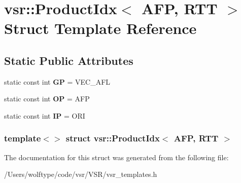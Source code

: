 \hypertarget{structvsr_1_1_product_idx_3_01_a_f_p_00_01_r_t_t_01_4}{\section{vsr\-:\-:Product\-Idx$<$ A\-F\-P, R\-T\-T $>$ Struct Template Reference}
\label{structvsr_1_1_product_idx_3_01_a_f_p_00_01_r_t_t_01_4}
}
\subsection*{Static Public Attributes}
\begin{DoxyCompactItemize}
\item 
\hypertarget{structvsr_1_1_product_idx_3_01_a_f_p_00_01_r_t_t_01_4_a68bdb5ba056c63dca34629e9232c19c9}{static const int {\bfseries G\-P} = V\-E\-C\-\_\-\-A\-F\-L}\label{structvsr_1_1_product_idx_3_01_a_f_p_00_01_r_t_t_01_4_a68bdb5ba056c63dca34629e9232c19c9}

\item 
\hypertarget{structvsr_1_1_product_idx_3_01_a_f_p_00_01_r_t_t_01_4_a8c5fbfea09cfeab2cc9fb8371e3c080f}{static const int {\bfseries O\-P} = A\-F\-P}\label{structvsr_1_1_product_idx_3_01_a_f_p_00_01_r_t_t_01_4_a8c5fbfea09cfeab2cc9fb8371e3c080f}

\item 
\hypertarget{structvsr_1_1_product_idx_3_01_a_f_p_00_01_r_t_t_01_4_a6d06527b61a2b587d1ec0305e3b1c161}{static const int {\bfseries I\-P} = O\-R\-I}\label{structvsr_1_1_product_idx_3_01_a_f_p_00_01_r_t_t_01_4_a6d06527b61a2b587d1ec0305e3b1c161}

\end{DoxyCompactItemize}
\subsubsection*{template$<$$>$ struct vsr\-::\-Product\-Idx$<$ A\-F\-P, R\-T\-T $>$}



The documentation for this struct was generated from the following file\-:\begin{DoxyCompactItemize}
\item 
/\-Users/wolftype/code/vsr/\-V\-S\-R/vsr\-\_\-templates.\-h\end{DoxyCompactItemize}
